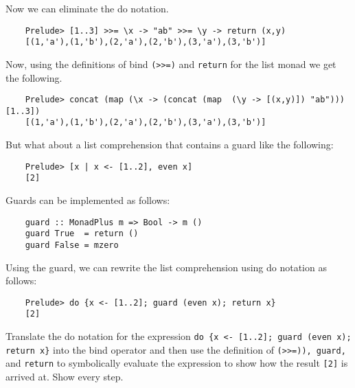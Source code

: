 \documentclass[11pt]{article}
\begin{document}
Now we can eliminate the do notation.
\begin{verbatim}
    Prelude> [1..3] >>= \x -> "ab" >>= \y -> return (x,y)
    [(1,'a'),(1,'b'),(2,'a'),(2,'b'),(3,'a'),(3,'b')]
\end{verbatim}

Now, using the definitions of bind {\tt{(>>=)}} and {\tt{return}} for the list
monad we get the following.

\begin{verbatim}
    Prelude> concat (map (\x -> (concat (map  (\y -> [(x,y)]) "ab")))  [1..3])
    [(1,'a'),(1,'b'),(2,'a'),(2,'b'),(3,'a'),(3,'b')]
\end{verbatim}
But what about a list comprehension that contains a guard like the following:\\
\begin{verbatim}
    Prelude> [x | x <- [1..2], even x]
    [2]
\end{verbatim}
Guards can be implemented as follows:
\begin{verbatim}
    guard :: MonadPlus m => Bool -> m ()
    guard True  = return ()
    guard False = mzero
\end{verbatim}
Using the guard, we can rewrite the list comprehension using do notation as follows:
\begin{verbatim}
    Prelude> do {x <- [1..2]; guard (even x); return x}
    [2]
\end{verbatim}

\begin{exercise}
Translate the do notation for the expression {\tt{do \{x <- [1..2]; guard (even
x); return x\}}} into the bind operator and then use the definition of
{\tt{(>>=)), guard,}} and {\tt{return}} to symbolically evaluate the expression
to show how the result {\tt{[2]}} is arrived at.  Show every step.
\end{exercise}









\end{document}
